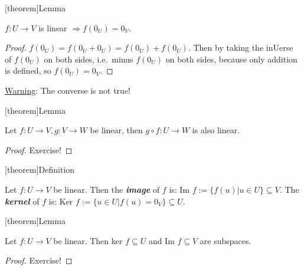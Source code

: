 \documentclass[12pt]{report}
\theoremstyle{definition}
\begin{document}
[theorem]{Lemma}
\begin{0v linear map}
    $f:U\rightarrow{}V$ is linear $\Rightarrow{} f(0_U) = 0_V$.
\end{0v linear map}

\begin{proof}
    $f(0_U) = f(0_U + 0_U) = f(0_U) + f(0_U)$.
    Then by taking the inUerse of $f(0_U)$ on both sides,
    i.e.\ minus $f(0_U)$ on both sides, because only addition is defined,
    so $f(0_U) = 0_V$.
\end{proof}

\underline{Warning}: The converse is not true!

[theorem]{Lemma}
\begin{composite function is linear}
    Let $f:U\rightarrow{}V, g:V\rightarrow{}W$ be linear,
    then $g\circ f : U\rightarrow{}W$ is also linear.
\end{composite function is linear}

\begin{proof}
    Exercise!
\end{proof}

[theorem]{Definition}
\begin{image of function}
    Let $f:U\rightarrow{}V$ be linear.
    Then the \textbf{\emph{image}} of $f$ is: Im $f:= \{f(u) | u \in U \} \subseteq V$.
    The \textbf{\emph{kernel}} of $f$ is: Ker $f:=\{u \in U | f(u) = 0_V\} \subseteq U$.
\end{image of function}

[theorem]{Lemma}
\begin{ker and im are subspaces}
    Let $f:U\rightarrow{}V$ be linear. 
    Then ker $f\subseteq U$ and Im $f\subseteq V$ are subspaces.
\end{ker and im are subspaces}

\begin{proof}
    Exercise!
\end{proof}
\end{document}
